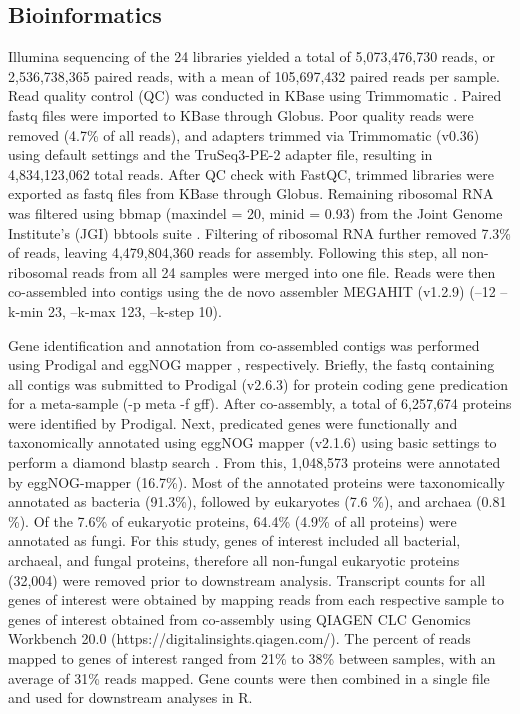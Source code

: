 \documentclass[
  sn-nature,
  lineno, referee]{sn-jnl}
\begin{document}
\subsection{Bioinformatics}\label{bioinformatics}

Illumina sequencing of the 24 libraries yielded a total of 5,073,476,730
reads, or 2,536,738,365 paired reads, with a mean of 105,697,432 paired
reads per sample. Read quality control (QC) was conducted in KBase
\citep{arkin_kbase_2018} using Trimmomatic
\citep{bolger_trimmomatic_2014}. Paired fastq files were imported to
KBase through Globus. Poor quality reads were removed (4.7\% of all
reads), and adapters trimmed via Trimmomatic (v0.36) using default
settings and the TruSeq3-PE-2 adapter file, resulting in 4,834,123,062
total reads. After QC check with FastQC, trimmed libraries were exported
as fastq files from KBase through Globus. Remaining ribosomal RNA was
filtered using bbmap (maxindel = 20, minid = 0.93) from the Joint Genome
Institute's (JGI) bbtools suite \citep{bushnell_bbmap_nodate}. Filtering
of ribosomal RNA further removed 7.3\% of reads, leaving 4,479,804,360
reads for assembly. Following this step, all non-ribosomal reads from
all 24 samples were merged into one file. Reads were then co-assembled
into contigs using the de novo assembler MEGAHIT (v1.2.9)
\citep{li_megahit_2015} (--12 --k-min 23, --k-max 123, --k-step 10).

Gene identification and annotation from co-assembled contigs was
performed using Prodigal \citep{hyatt_prodigal_2010} and eggNOG mapper
\citep{cantalapiedra_eggnog-mapper_2021}, respectively. Briefly, the
fastq containing all contigs was submitted to Prodigal (v2.6.3) for
protein coding gene predication for a meta-sample (-p meta -f gff).
After co-assembly, a total of 6,257,674 proteins were identified by
Prodigal. Next, predicated genes were functionally and taxonomically
annotated using eggNOG mapper (v2.1.6) using basic settings to perform a
diamond blastp search \citep{buchfink_sensitive_2021}. From this,
1,048,573 proteins were annotated by eggNOG-mapper (16.7\%). Most of the
annotated proteins were taxonomically annotated as bacteria (91.3\%),
followed by eukaryotes (7.6 \%), and archaea (0.81 \%). Of the 7.6\% of
eukaryotic proteins, 64.4\% (4.9\% of all proteins) were annotated as
fungi. For this study, genes of interest included all bacterial,
archaeal, and fungal proteins, therefore all non-fungal eukaryotic
proteins (32,004) were removed prior to downstream analysis. Transcript
counts for all genes of interest were obtained by mapping reads from
each respective sample to genes of interest obtained from co-assembly
using QIAGEN CLC Genomics Workbench 20.0
(https://digitalinsights.qiagen.com/). The percent of reads mapped to
genes of interest ranged from 21\% to 38\% between samples, with an
average of 31\% reads mapped. Gene counts were then combined in a single
file and used for downstream analyses in R.
\end{document}
